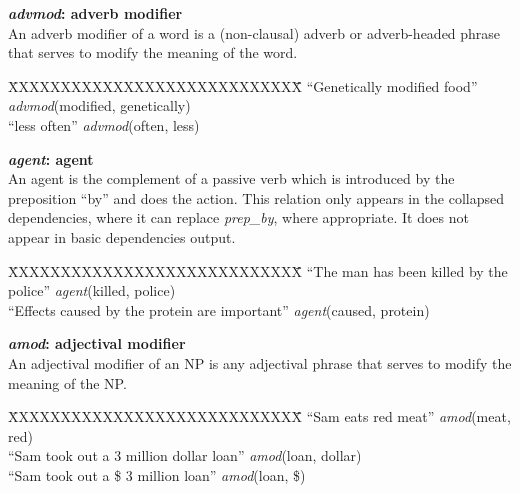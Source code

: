 \documentclass[11pt,letterpaper]{article}
\begin{document}
\noindent\textbf{\emph{advmod}: adverb modifier}\\
An adverb modifier of a word is a (non-clausal) adverb or adverb-headed phrase that serves to modify the meaning of the word.
\begin{tabbing}
\hspace{1cm} \=XXXXXXXXXXXXXXXXXXXXXXXXXXXX\= \hspace{1cm}\=  \kill
\>  ``Genetically modified food'' \> \> \emph{advmod}(modified, genetically)\\
\> ``less often'' \> \> \emph{advmod}(often, less)\\
\end{tabbing}

\noindent\textbf{\emph{agent}: agent}\\
An agent is the complement of a passive verb which is introduced by the preposition ``by'' and does the action.
This relation only appears in the collapsed dependencies, where it can
replace \emph{prep\_by}, where appropriate. It does not appear in
basic dependencies output.
\begin{tabbing}
\hspace{1cm} \=XXXXXXXXXXXXXXXXXXXXXXXXXXXX\= \hspace{1cm}\=  \kill
\>  ``The man has been killed by the police'' \> \> \emph{agent}(killed, police)\\
\> ``Effects caused by the protein are important'' \> \> \emph{agent}(caused, protein)\\
\end{tabbing}

\noindent\textbf{\emph{amod}: adjectival modifier}\\
An adjectival modifier of an NP is any adjectival phrase that serves to modify the meaning of the NP.
\begin{tabbing}
\hspace{1cm} \=XXXXXXXXXXXXXXXXXXXXXXXXXXXX\= \hspace{1cm}\=  \kill
\> ``Sam eats red meat'' \> \> \emph{amod}(meat, red)\\
\> ``Sam took out  a 3 million dollar loan'' \> \> \emph{amod}(loan, dollar)\\
\> ``Sam took out  a \$ 3 million loan'' \> \> \emph{amod}(loan, \$)\\
\end{tabbing}
\end{document}
